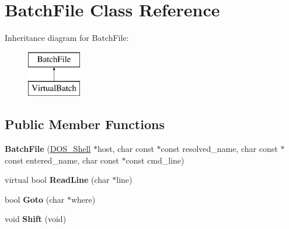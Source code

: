 \hypertarget{classBatchFile}{\section{Batch\-File Class Reference}
\label{classBatchFile}
}
Inheritance diagram for Batch\-File\-:\begin{figure}[H]
\begin{center}
\leavevmode
\includegraphics[height=2.000000cm]{classBatchFile}
\end{center}
\end{figure}
\subsection*{Public Member Functions}
\begin{DoxyCompactItemize}
\item 
\hypertarget{classBatchFile_a775abb3eea26411ba33361cc2cc24a5e}{{\bfseries Batch\-File} (\hyperlink{classDOS__Shell}{D\-O\-S\-\_\-\-Shell} $\ast$host, char const $\ast$const resolved\-\_\-name, char const $\ast$const entered\-\_\-name, char const $\ast$const cmd\-\_\-line)}\label{classBatchFile_a775abb3eea26411ba33361cc2cc24a5e}

\item 
\hypertarget{classBatchFile_ae7aff09b12fefc85bdd3004af1346abd}{virtual bool {\bfseries Read\-Line} (char $\ast$line)}\label{classBatchFile_ae7aff09b12fefc85bdd3004af1346abd}

\item 
\hypertarget{classBatchFile_ad0c27c1a7b4a3d48f0b7a456efaeda43}{bool {\bfseries Goto} (char $\ast$where)}\label{classBatchFile_ad0c27c1a7b4a3d48f0b7a456efaeda43}

\item 
\hypertarget{classBatchFile_a41d411d2ace578a96093aefcac40f8d3}{void {\bfseries Shift} (void)}\label{classBatchFile_a41d411d2ace578a96093aefcac40f8d3}

\end{DoxyCompactItemize}

